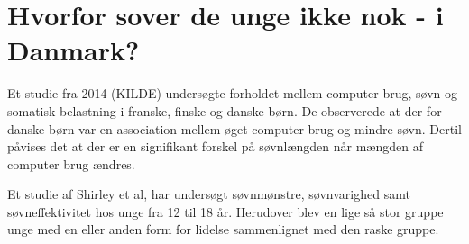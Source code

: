 \section{Hvorfor sover de unge ikke nok - i Danmark?}
\label{sec:hvorforSoverDeUngeIkkeNok}

Et studie fra 2014 (KILDE) undersøgte forholdet mellem computer brug, søvn og somatisk belastning i franske, finske og danske børn. De observerede at der for danske børn var en association mellem øget computer brug og mindre søvn. Dertil påvises det at der er en signifikant forskel på søvnlængden når mængden af computer brug ændres.


Et studie af Shirley et al, har undersøgt søvnmønstre, søvnvarighed samt søvneffektivitet hos unge fra 12 til 18 år. Herudover blev en lige så stor gruppe unge med en eller anden form for lidelse sammenlignet med den raske gruppe.  




